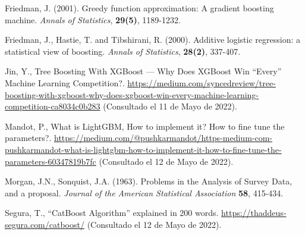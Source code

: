 \documentclass[12pt,twoside]{article}
\begin{document}
\begin{thebibliography}{100}
 Friedman, J. (2001). Greedy function approximation: A gradient boosting machine. \textit{Annals of Statistics}, \textbf{29(5)}, 1189-1232.


 Friedman, J., Hastie, T. and Tibshirani, R. (2000). Additive logistic regression: a statistical view of boosting. \textit{Annals of Statistics}, \textbf{28(2)}, 337-407.


 Jin, Y., Tree Boosting With XGBoost — Why Does XGBoost Win ``Every'' Machine Learning Competition?. \url{https://medium.com/syncedreview/tree-boosting-with-xgboost-why-does-xgboost-win-every-machine-learning-competition-ca8034c0b283} (Consultado el 11 de Mayo de 2022).



 Mandot, P., What is LightGBM, How to implement it? How to fine tune the parameters?. \url{https://medium.com/@pushkarmandot/https-medium-com-pushkarmandot-what-is-lightgbm-how-to-implement-it-how-to-fine-tune-the-parameters-60347819b7fc} (Consultado el 12 de Mayo de 2022).

 Morgan, J.N., Sonquist, J.A. (1963). Problems in the Analysis of Survey Data, and a proposal. \textit{Journal of the American Statistical Association} \textbf{58}, 415-434.

 Segura, T., ``CatBoost Algorithm'' explained in 200 words. \url{https://thaddeus-segura.com/catboost/} (Consultado el 12 de Mayo de 2022).








\end{thebibliography}
\end{document}
